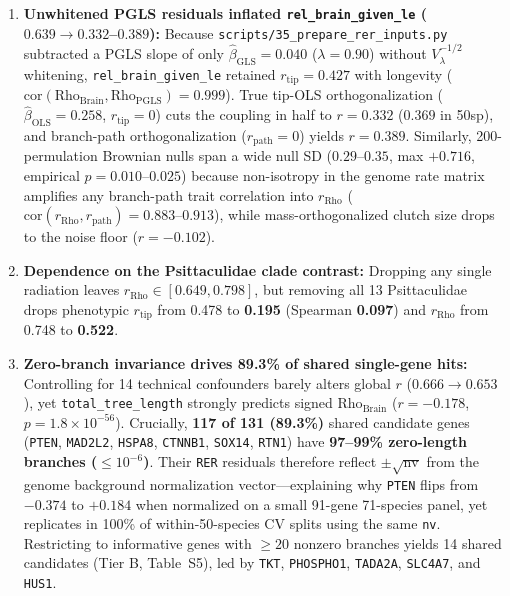 \documentclass[10pt,a4paper,twocolumn]{article}
\begin{document}
\begin{enumerate}
    \item \textbf{Unwhitened PGLS residuals inflated \texttt{rel\_brain\_given\_le} ($0.639 \to 0.332$--$0.389$):} Because \texttt{scripts/35\_prepare\_rer\_inputs.py} subtracted a PGLS slope of only $\hat{\beta}_{\text{GLS}} = 0.040$ ($\lambda = 0.90$) without $V_\lambda^{-1/2}$ whitening, \texttt{rel\_brain\_given\_le} retained $r_{\text{tip}} = 0.427$ with longevity ($\text{cor}(\text{Rho}_{\text{Brain}}, \text{Rho}_{\text{PGLS}}) = 0.999$). True tip-OLS orthogonalization ($\hat{\beta}_{\text{OLS}} = 0.258$, $r_{\text{tip}} = 0$) cuts the coupling in half to \textbf{$r = 0.332$} ($0.369$ in 50sp), and branch-path orthogonalization ($r_{\text{path}} = 0$) yields \textbf{$r = 0.389$}. Similarly, 200-permulation Brownian nulls span a wide null SD ($0.29$--$0.35$, max $+0.716$, empirical $p = 0.010$--$0.025$) because non-isotropy in the genome rate matrix amplifies any branch-path trait correlation into $r_{\text{Rho}}$ ($\text{cor}(r_{\text{Rho}}, r_{\text{path}}) = 0.883$--$0.913$), while mass-orthogonalized clutch size drops to the noise floor ($r = -0.102$).
    \item \textbf{Dependence on the Psittaculidae clade contrast:} Dropping any single radiation leaves $r_{\text{Rho}} \in [0.649, 0.798]$, but removing all 13 Psittaculidae drops phenotypic $r_{\text{tip}}$ from 0.478 to \textbf{0.195} (Spearman \textbf{0.097}) and $r_{\text{Rho}}$ from 0.748 to \textbf{0.522}.
    \item \textbf{Zero-branch invariance drives 89.3\% of shared single-gene hits:} Controlling for 14 technical confounders barely alters global $r$ ($0.666 \to 0.653$), yet \texttt{total\_tree\_length} strongly predicts signed $\text{Rho}_{\text{Brain}}$ ($r = -0.178$, $p = 1.8\times 10^{-56}$). Crucially, \textbf{117 of 131 (89.3\%)} shared candidate genes (\texttt{PTEN}, \texttt{MAD2L2}, \texttt{HSPA8}, \texttt{CTNNB1}, \texttt{SOX14}, \texttt{RTN1}) have \textbf{97--99\% zero-length branches ($\le 10^{-6}$)}. Their \texttt{RER} residuals therefore reflect $\pm\sqrt{\text{nv}}$ from the genome background normalization vector—explaining why \texttt{PTEN} flips from $-0.374$ to $+0.184$ when normalized on a small 91-gene 71-species panel, yet replicates in 100\% of within-50-species CV splits using the same \texttt{nv}. Restricting to informative genes with $\ge 20$ nonzero branches yields 14 shared candidates (Tier B, Table~S5), led by \texttt{TKT}, \texttt{PHOSPHO1}, \texttt{TADA2A}, \texttt{SLC4A7}, and \texttt{HUS1}.
\end{enumerate}
\end{document}
